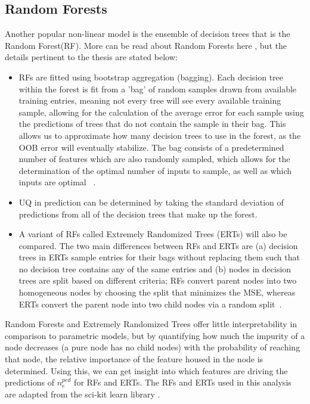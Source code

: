 \documentclass[a4paper, twoside, final, 12pt]{article}
\begin{document}
\subsection{Random Forests}
Another popular non-linear model is the ensemble of decision trees \cite{DT_OG} that is the Random Forest(RF). More can be read about Random Forests here \cite{RF_OG, 598994}, but the details pertinent to the thesis are stated below:
\begin{itemize}
	\item RFs are fitted using bootstrap aggregation (bagging). Each decision tree within the forest is fit from a 'bag' of random samples drawn from available training entries, meaning not every tree will see every available training sample, allowing for the calculation of the average error for each sample using the predictions of trees that do not contain the sample in their bag. This allows us to approximate how many decision trees to use in the forest, as the OOB error will eventually stabilize. The bag consists of a predetermined number of features which are also randomly sampled, which allows for the determination of the optimal number of inputs to sample, as well as which inputs are optimal ~\cite{hastie01statisticallearning}.
	\item UQ in prediction can be determined by taking the standard deviation of predictions from all of the decision trees that make up the forest. 
	\item A variant of RFs called Extremely Randomized Trees (ERTs) will also be compared. The two main differences between RFs and ERTs are (a) decision trees in ERTs sample entries for their bags without replacing them such that no decision tree contains any of the same entries and (b) nodes in decision trees are split based on different criteria; RFs convert parent nodes into two homogeneous nodes by choosing the split that minimizes the MSE, whereas ERTs convert the parent node into two child nodes via a random split~\cite{geurts_extremely_2006}.
\end{itemize}

Random Forests and Extremely Randomized Trees offer little interpretability in comparison to parametric models, but by quantifying how much the impurity of a node decreases (a pure node has no child nodes) with the probability of reaching that node, the relative importance of the feature housed in the node is determined. Using this, we can get insight into which features are driving the predictions of $n_e^{ped}$ for RFs and ERTs. The RFs and ERTs used in this analysis are adapted from the sci-kit learn library \cite{scikit-learn}. 
\end{document}
